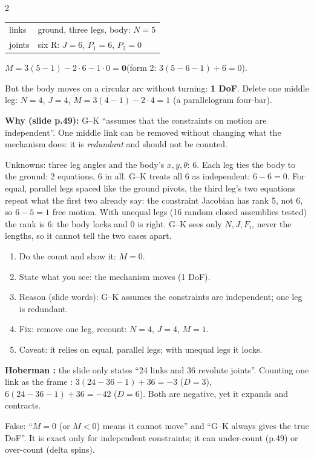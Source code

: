 \begin{multicols}{2}
\label{w1:odd}
\begin{worked}[the slide's system, $D=3$]
\begin{tabular}{@{}ll@{}}
links & ground, three legs, body: $N=5$\\
joints & six R: $J=6$, $P_1=6$, $P_2=0$
\end{tabular}\par
$M=3(5-1)-2\cdot6-1\cdot0=\mathbf 0$\quad(form 2: $3(5-6-1)+6=0$).\par
But the body moves on a circular arc without turning: \textbf{1 DoF}. Delete one middle leg: $N=4$, $J=4$, $M=3(4-1)-2\cdot4=1$ (a parallelogram four-bar). \chk
\end{worked}
\textbf{Why (slide p.49):} G--K ``assumes that the constraints on motion are independent''. One middle link can be removed without changing what the mechanism does: it is \emph{redundant} and should not be counted.
\begin{deriv}
Unknowns: three leg angles and the body's $x,y,\theta$: 6. Each leg ties the body to the ground: 2 equations, 6 in all. G--K treats all 6 as independent: $6-6=0$. For equal, parallel legs spaced like the ground pivots, the third leg's two equations repeat what the first two already say: the constraint Jacobian has rank 5, not 6, so $6-5=1$ free motion. With unequal legs (16 random closed assemblies tested) the rank is 6: the body locks and 0 is right. G--K sees only $N,J,F_i$, never the lengths, so it cannot tell the two cases apart. \chk
\end{deriv}
\begin{recipe}
\begin{enumerate}
\item Do the count and show it: $M=0$.
\item State what you see: the mechanism moves (1 DoF).
\item Reason (slide words): G--K assumes the constraints are independent; one leg is redundant.
\item Fix: remove one leg, recount: $N=4$, $J=4$, $M=1$.
\item Caveat: it relies on equal, parallel legs; with unequal legs it locks.
\end{enumerate}
\end{recipe}
\textbf{Hoberman :} the slide only states ``24 links and 36 revolute joints''. Counting one link as the frame \added: $3(24-36-1)+36=-3$ ($D=3$), $6(24-36-1)+36=-42$ ($D=6$). Both are negative, yet it expands and contracts. \chk
\begin{trap}
False: ``$M=0$ (or $M<0$) means it cannot move'' and ``G--K always gives the true DoF''. It is exact only for independent constraints; it can under-count (p.49) or over-count (delta spins).
\end{trap}


\end{multicols}
